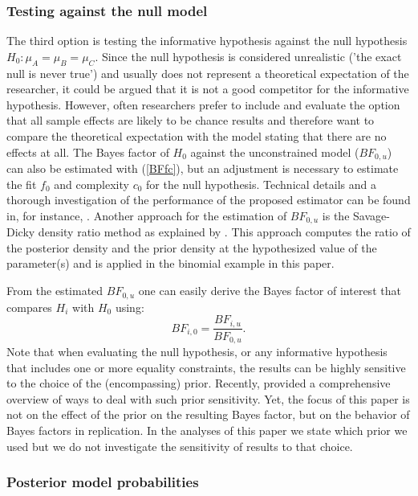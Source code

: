 \documentclass[11pt,reqno]{article}
\begin{document}
\subsubsection{Testing against the null model}
The third option is testing the informative hypothesis against the null hypothesis $H_0: \mu_A = \mu_B = \mu_C$. Since the null hypothesis is considered unrealistic ('the exact null is never true') and usually does not represent a theoretical expectation of the researcher, it could be argued that it is not a good competitor for the informative hypothesis. However, often researchers prefer to include and evaluate the option that all sample effects are likely to be chance results and therefore want to compare the theoretical expectation with the model stating that there are no effects at all.
The Bayes factor of $H_0$ against the unconstrained model ($BF_{0,u}$) can also be estimated with (\ref{BFfc}), but an adjustment is necessary to estimate the fit $f_0$ and complexity $c_0$ for the null hypothesis. Technical details and a thorough investigation of the performance of the proposed estimator can be found in, for instance, \textcite{mulder_equality_2010}. Another approach for the estimation of $BF_{0,u}$ is the Savage-Dicky density ratio method as explained by \textcite{wagenmakers_bayesian_2010}. This approach computes the ratio of the posterior density and the prior density at the hypothesized value of the parameter(s) and is applied in the binomial example in this paper.

From the estimated $BF_{0,u}$ one can easily derive the Bayes factor of interest that compares $H_i$ with $H_0$ using:
\begin{equation*}
  BF_{i,0}=\frac{BF_{i,u}}{BF_{0,u}}.
\end{equation*}
Note that when evaluating the null hypothesis, or any informative hypothesis that includes one or more equality constraints, the results can be highly sensitive to the choice of the (encompassing) prior.
Recently, \textcite{hoijtink_prior_2021} provided a comprehensive overview of ways to deal with such prior sensitivity. 
Yet, the focus of this paper is not on the effect of the prior on the resulting Bayes factor, but on the behavior of Bayes factors in replication. In the analyses of this paper we state which prior we used but we do not investigate the sensitivity of results to that choice.


\subsubsection{Posterior model probabilities}
\end{document}
